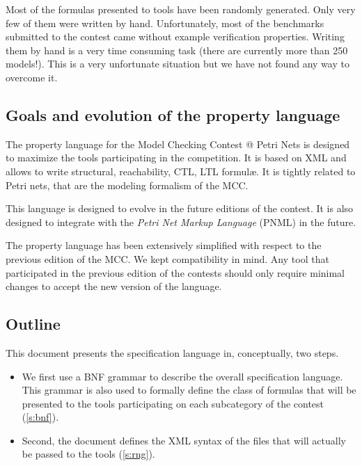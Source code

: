 \documentclass[10pt,english,a4paper]{article}
\makeatletter
\newcommand{\mcc}[0]{MCC}
\newcommand{\mccl}[0]{Model Checking Contest @ Petri Nets}
\makeatother
\begin{document}

Most of the formulas presented to tools have been randomly generated.
Only very few of them were written by hand.
Unfortunately, most of the benchmarks submitted to the contest came without
example verification properties.
Writing them by hand is a very time consuming task (there are currently more
than 250 models!).
This is a very unfortunate situation but we have not found any way to
overcome it.

\subsection{Goals and evolution of the property language}

The property language for the \mccl{} is designed to maximize
the tools participating in the competition.
It is based on XML and allows to write structural, reachability, CTL, LTL formul{\ae}.
It is tightly related to Petri nets, that are the modeling formalism of the
\mcc{}.

This language is designed to evolve in the future editions of the contest.
It is also designed to integrate with the \emph{Petri Net Markup Language}
(PNML) in the future.

The property language has been
extensively simplified with respect to the previous edition of the \mcc{}.
We kept compatibility in mind.
Any tool that participated in the previous edition of the contests should
only require minimal changes to accept the new version of the language.

\subsection{Outline}

This document presents the specification language in, conceptually, two steps.
\begin{itemize}
\item
  We first use a BNF grammar to describe the overall specification
  language.  This grammar is also used to formally define the class of
  formulas that will be presented to the tools participating on each
  subcategory of the contest (\cref{s:bnf}).
\item
  Second, the document defines the XML syntax of the files that will
  actually be passed to the tools (\cref{s:rng}).
\end{itemize}
\end{document}
